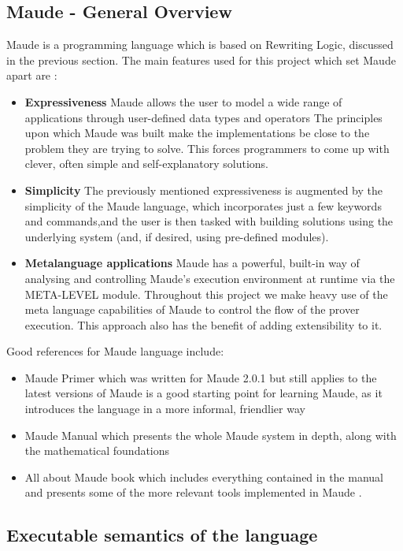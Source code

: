 \documentclass[12pt,a4paper]{article}
\begin{document}
\subsection{Maude - General Overview}
Maude is a programming language which is based on Rewriting Logic, discussed in the previous section. 
The main features used for this project which set Maude apart are :
\begin{itemize}
	\item \textbf{Expressiveness}
	\subitem Maude allows the user to model a wide range of applications through user-defined data types and operators
	\subitem The principles upon which Maude was built make the implementations be close to the problem they are trying to solve. This forces programmers to come up with clever, often simple and self-explanatory solutions.
	\item \textbf{Simplicity}
	\subitem
	The previously mentioned expressiveness is augmented by the simplicity of the Maude language, which incorporates just a few keywords and commands,and the user is then tasked with building solutions using the underlying system (and, if desired, using pre-defined modules).
	\item \textbf{Metalanguage applications}
	\subitem
	Maude has a powerful, built-in way of analysing and controlling Maude's execution environment at runtime via the META-LEVEL module. Throughout this project we make heavy use of the meta language capabilities of Maude to control the flow of the prover execution. This approach also has the benefit of adding extensibility to it.
\end{itemize} 
Good references for Maude language include:
\begin{itemize}
	\item Maude Primer \cite{primer} which was written for Maude 2.0.1 but still applies to the latest versions of Maude is a good starting point for learning Maude, as it introduces the language in a more informal, friendlier way
	\item Maude Manual \cite{manual} which presents the whole Maude system in depth, along with the mathematical foundations
	\item All about Maude book \cite{allAboutMaude} which includes everything contained in the manual and presents some of the more relevant tools implemented in Maude .
\end{itemize}
\subsection{Executable semantics of the language}
\end{document}
